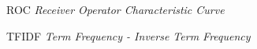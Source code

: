 \begin{siglas}
\item[ROC] \textit{Receiver Operator Characteristic Curve}
\item[TFIDF] \textit{Term Frequency - Inverse Term Frequency}
\end{siglas}
